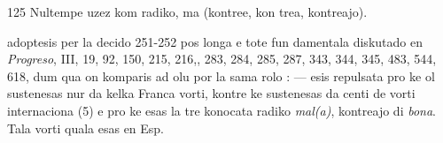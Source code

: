 \begin{VUpage}[129]{125}
Nultempe uzez  kom radiko, ma  (kontree, kon\cc
trea, kontreajo).

 adoptesis per la decido 251-252 pos longa e tote fun\cc
damentala diskutado en \textit{Progreso}, III, 19, 92, 150, 215, 216,, 283, 284, 285, 287, 343, 344, 345, 483, 544, 618,\nl
dum qua on komparis ad olu por la sama rolo : \nl
{} ---  esis repulsata pro ke ol sustenesas nur da kelka\nl
Franca vorti, kontre ke  sustenesas da centi de vorti\nl
internaciona (5) e pro ke  esas la tre konocata radiko\nl
\textit{mal(a)}, kontreajo di \textit{bona}. Tala vorti quala esas en Esp.\parplein
\end{VUpage}

